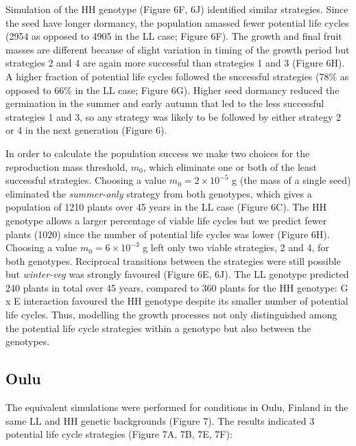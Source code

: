 \documentclass[phd]{infthesis}
\begin{document}
Simulation of the HH genotype (Figure 6F, 6J) identified similar
strategies. Since the seed have longer dormancy, the population amassed
fewer potential life cycles (2954 as opposed to 4905 in the LL case;
Figure 6F). The growth and final fruit masses are different because of
slight variation in timing of the growth period but strategies 2 and 4
are again more successful than strategies 1 and 3 (Figure 6H). A higher
fraction of potential life cycles followed the successful strategies
(78\% as opposed to 66\% in the LL case; Figure 6G). Higher seed
dormancy reduced the germination in the summer and early autumn that led
to the less successful strategies 1 and 3, so any strategy was likely to
be followed by either strategy 2 or 4 in the next generation (Figure 6).

In order to calculate the population success we make two choices for the
reproduction mass threshold, \(m_{0}\), which eliminate one or both of
the least successful strategies. Choosing a value
\(m_{0} = 2 \times 10^{- 5}\) g (the mass of a single seed) eliminated
the \emph{summer-only} strategy from both genotypes, which gives a
population of 1210 plants over 45 years in the LL case (Figure 6C). The
HH genotype allows a larger percentage of viable life cycles but we
predict fewer plants (1020) since the number of potential life cycles
was lower (Figure 6H). Choosing a value \(m_{0} = 6 \times 10^{- 3}\) g
left only two viable strategies, 2 and 4, for both genotypes. Reciprocal
transitions between the strategies were still possible but
\emph{winter-veg} was strongly favoured (Figure 6E, 6J). The LL genotype
predicted 240 plants in total over 45 years, compared to 360 plants for
the HH genotype: G x E interaction favoured the HH genotype despite its
smaller number of potential life cycles. Thus, modelling the growth
processes not only distinguished among the potential life cycle
strategies within a genotype but also between the genotypes.



\subsection{Oulu}
\label{oulu}

The equivalent simulations were performed for conditions in Oulu,
Finland in the same LL and HH genetic backgrounds (Figure 7). The
results indicated 3 potential life cycle strategies (Figure 7A, 7B, 7E,
7F):
\end{document}
